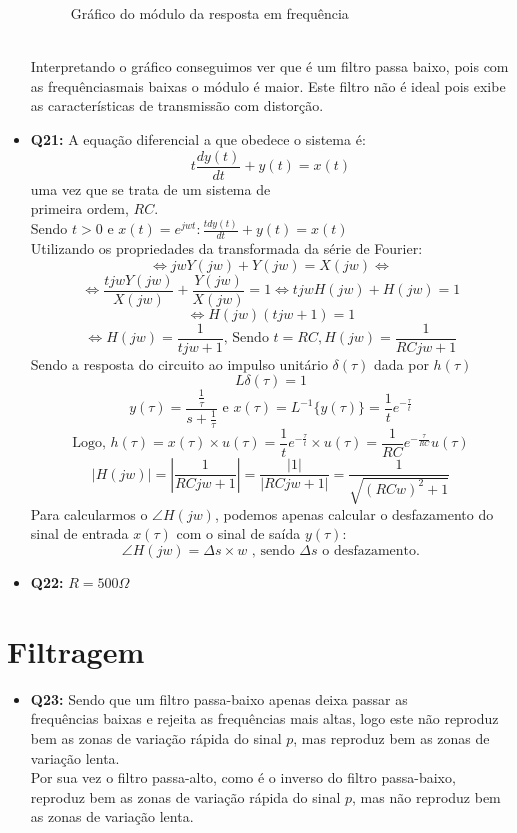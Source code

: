 \documentclass[a4paper, 12pt]{article}
\begin{document}
\begin{itemize}
\begin{figure}[!ht]
              \vspace{-10px}
              \caption{Gráfico do módulo da resposta em frequência}
          \end{figure}
          \\Interpretando o gráfico conseguimos ver que é um filtro passa baixo, pois com as frequênciasmais baixas o módulo é maior. Este filtro não é ideal pois exibe as características de transmissão com distorção.
    \item \textbf{Q21:} A equação diferencial a que obedece o sistema é:
          \[t\frac{dy(t)}{dt} + y(t) = x(t)\]
          uma vez que se trata de um sistema de\\
          primeira ordem, $RC$.\\
          Sendo $t>0$ e $x(t) = e^{jwt}: \frac{tdy(t)}{dt} + y(t) = x(t)$\\
          Utilizando os propriedades da transformada da série de Fourier:
          \[\Leftrightarrow jwY(jw) + Y(jw) = X(jw)\Leftrightarrow\]
          \[\Leftrightarrow \frac{tjwY(jw)}{X(jw)} + \frac{Y(jw)}{X(jw)} = 1 \Leftrightarrow tjwH(jw) + H(jw) = 1\]
          \[\Leftrightarrow H(jw)(tjw + 1) = 1\]
          \[\Leftrightarrow H(jw) = \frac{1}{tjw + 1} \textrm{, Sendo } t = RC, H(jw) = \frac{1}{RCjw + 1}\]
          Sendo a resposta do circuito ao impulso unitário $\delta(\tau)$ dada por $h(\tau)$
          \[L\delta(\tau) = 1\]
          \[y(\tau) = \frac{\frac{1}{\tau}}{s + \frac{1}{\tau}} \textrm{ e } x(\tau) = L^{-1}\{y(\tau)\} = \frac{1}{t}e^{-\frac{\tau}{t}}\]
          \[\textrm{Logo, } h(\tau) = x(\tau)\times u(\tau) = \frac{1}{t}e^{-\frac{\tau}{t}} \times u(\tau) = \frac{1}{RC}e^{-\frac{\tau}{RC}}u(\tau)\]
          \[ |H(jw)| = |\frac{1}{RCjw + 1}| = \frac{|1|}{|RCjw +1|} = \frac{1}{\sqrt{{(RCw)}^{2} + 1}}\]
          Para calcularmos o $\angle H(jw)$, podemos apenas calcular o desfazamento do sinal de entrada $x(\tau)$ com o sinal de saída $y(\tau)$:
          \[\angle H(jw) = \Delta s \times w \textrm{ , sendo } \Delta s \textrm{ o desfazamento.}\]
    \item \textbf{Q22:} $R = 500 \Omega$
\end{itemize}
\newpage
\section{Filtragem}
\begin{itemize}
    \item \textbf{Q23:} Sendo que um filtro passa-baixo apenas deixa passar as\\
          frequências baixas e rejeita as frequências mais altas, logo este não reproduz bem as zonas de variação rápida do sinal $p$, mas reproduz bem as zonas de variação lenta.\\
          Por sua vez o filtro passa-alto, como é o inverso do filtro passa-baixo, reproduz bem as zonas de variação rápida do sinal $p$, mas não reproduz bem as zonas de variação lenta.
\end{itemize}
\newpage
\end{document}

